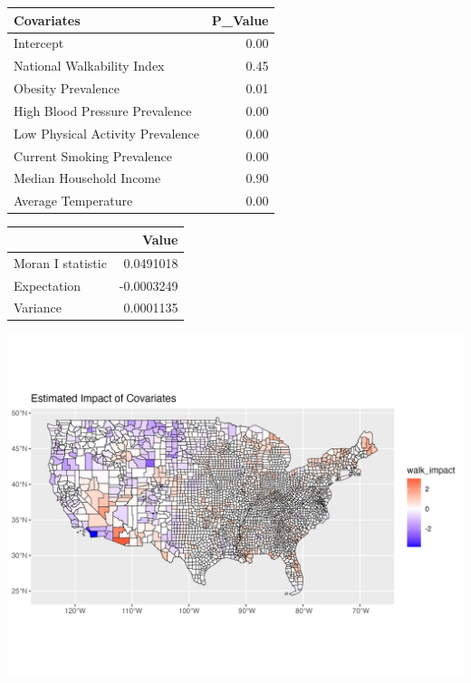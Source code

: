 \documentclass[
]{article}
\begin{document}
\begin{longtable}[]{@{}lr@{}}
\toprule\noalign{}
Covariates & P\_Value \\
\midrule\noalign{}
\endhead
\bottomrule\noalign{}
\endlastfoot
Intercept & 0.00 \\
National Walkability Index & 0.45 \\
Obesity Prevalence & 0.01 \\
High Blood Pressure Prevalence & 0.00 \\
Low Physical Activity Prevalence & 0.00 \\
Current Smoking Prevalence & 0.00 \\
Median Household Income & 0.90 \\
Average Temperature & 0.00 \\
\end{longtable}

\begin{longtable}[]{@{}lr@{}}
\toprule\noalign{}
& Value \\
\midrule\noalign{}
\endhead
\bottomrule\noalign{}
\endlastfoot
Moran I statistic & 0.0491018 \\
Expectation & -0.0003249 \\
Variance & 0.0001135 \\
\end{longtable}

\begin{center}
\includegraphics{impact_plot.png}
\end{center}
\end{document}
